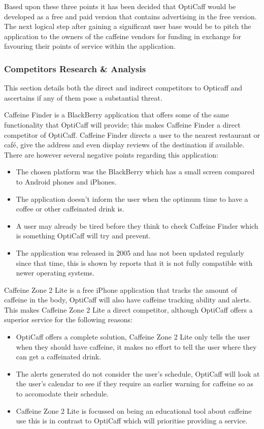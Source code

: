 Based upon these three points it has been decided that OptiCaff would be developed as a free and paid version that contains advertising in the free version.
The next logical step after gaining a significant user base would be to pitch the application to the owners of the caffeine vendors for funding in exchange for favouring their points of service within the application.  

\subsubsection{Competitors Research \& Analysis}
\label{sec:competitors}
This section details both the direct and indirect competitors to Opticaff and ascertains if any of them pose a substantial threat. 

Caffeine Finder is a BlackBerry application that offers some of the same functionality that OptiCaff will provide; this makes Caffeine Finder a direct competitor of OptiCaff. 
Caffeine Finder directs a user to the nearest restaurant or café, give the address and even display reviews of the destination if available. 
There are however several negative points regarding this application:
\begin{itemize}
	\item{The chosen platform was the BlackBerry which has a small screen compared to Android phones and iPhones.} 
	\item{The application doesn’t inform the user when the optimum time to have a coffee or other caffeinated drink is.}
	\item{A user may already be tired before they think to check Caffeine Finder which is something OptiCaff will try and prevent.} 
	\item{The application was released in 2005 and has not been updated regularly since that time, this is shown by reports that it is not fully compatible with newer operating systems.}
\end{itemize}

Caffeine Zone 2 Lite is a free iPhone application that tracks the amount of caffeine in the body, OptiCaff will also have caffeine tracking ability and alerts. 
This makes Caffeine Zone 2 Lite a direct competitor, although OptiCaff offers a superior service for the following reasons:  
\begin{itemize}
	\item{OptiCaff offers a complete solution, Caffeine Zone 2 Lite only tells the user when they should have caffeine, it makes no effort to tell the user where they can get a caffeinated drink.} 
	\item{The alerts generated do not consider the user’s schedule, OptiCaff will look at the user’s calendar to see if they require an earlier warning for caffeine so as to accomodate their schedule.}
	\item{Caffeine Zone 2 Lite is focussed on being an educational tool about caffeine use this is in contrast to OptiCaff which will prioritise providing a service.}
\end{itemize}

